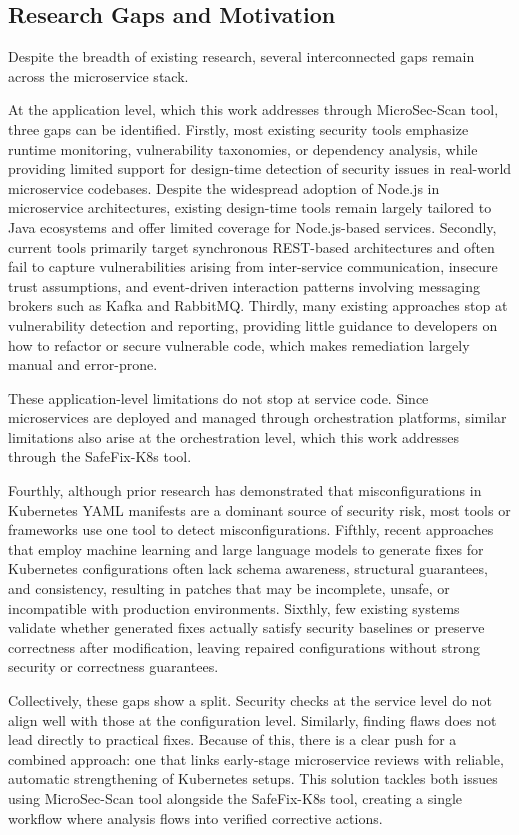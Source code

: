 \documentclass[preprint,12pt]{elsarticle}
\newcommand{\new}[1]{#1}
\begin{document}
\subsection{Research Gaps and Motivation}
Despite the breadth of existing research, several interconnected gaps remain across the microservice stack.
\new{
At the application level, which this work addresses through MicroSec-Scan tool, three gaps can be identified. Firstly, most existing security tools emphasize runtime monitoring, vulnerability taxonomies, or dependency analysis, while providing limited support for design-time detection of security issues in real-world microservice codebases. Despite the widespread adoption of Node.js in microservice architectures, existing design-time tools remain largely tailored to Java ecosystems and offer limited coverage for Node.js-based services. Secondly, current tools primarily target synchronous REST-based architectures and often fail to capture vulnerabilities arising from inter-service communication, insecure trust assumptions, and event-driven interaction patterns involving messaging brokers such as Kafka and RabbitMQ. Thirdly, many existing approaches stop at vulnerability detection and reporting, providing little guidance to developers on how to refactor or secure vulnerable code, which makes remediation largely manual and error-prone.
}

\new{
These application-level limitations do not stop at service code. Since microservices are deployed and managed through orchestration platforms, similar limitations also arise at the orchestration level, which this work addresses through the SafeFix-K8s tool.
}

\new{
Fourthly, although prior research has demonstrated that misconfigurations in Kubernetes YAML manifests are a dominant source of security risk, most tools or frameworks use one tool to detect misconfigurations. Fifthly, recent approaches that employ machine learning and large language models to generate fixes for Kubernetes configurations often lack schema awareness, structural guarantees, and consistency, resulting in patches that may be incomplete, unsafe, or incompatible with production environments. Sixthly, few existing systems validate whether generated fixes actually satisfy security baselines or preserve correctness after modification, leaving repaired configurations without strong security or correctness guarantees.
}

\new{
Collectively, these gaps show a split. Security checks at the service level do not align well with those at the configuration level. Similarly, finding flaws \new{does not} lead directly to practical fixes. Because of this, there is a clear push for a combined approach: one that links early-stage microservice reviews with reliable, automatic strengthening of Kubernetes setups. This solution tackles both issues using MicroSec-Scan tool alongside the SafeFix-K8s tool, creating a single workflow where analysis flows into verified corrective actions.
}
\end{document}
